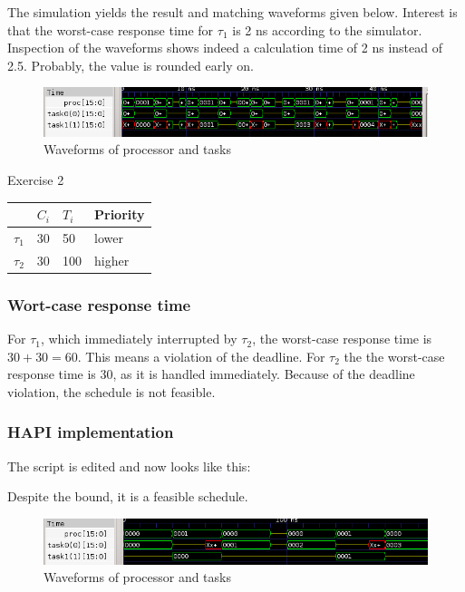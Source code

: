 \begin{homeworkProblem}
The simulation yields the result and matching waveforms given below. Interest is that the worst-case response time for $\tau_1$ is 2 ns according to the simulator. 
Inspection of the waveforms shows indeed a calculation time of 2 ns instead of 2.5. Probably, the value is rounded early on.


\begin{figure}[h]
	\label{fig:hapi_wave_1}
	\includegraphics[width=480px]{figures/hapi_wave_1.png}
	\caption{Waveforms of processor and tasks}
\end{figure}

\newpage

\begin{homeworkSection}{Exercise 2}
\begin{tabular}{l|l|l|l}
	& $C_i$ & $T_i$ & Priority \\
	\hline
	$\tau_1$ & 30 & 50 & lower \\
	\hline
	$\tau_2$ & 30 & 100 & higher \\
\end{tabular}

\subsubsection{Wort-case response time}

For $\tau_1$, which immediately interrupted by $\tau_2$, the worst-case response time is $30+30=60$. This means a violation of the deadline. 
For $\tau_2$ the the worst-case response time is 30, as it is handled immediately.
Because of the deadline violation, the schedule is not feasible.

\subsubsection{HAPI implementation}

The script is edited and now looks like this:


Despite the bound, it is a feasible schedule.

\begin{figure}[h]
	\label{fig:hapi_wave_2}
	\includegraphics[width=480px]{figures/hapi_wave_2.png}
	\caption{Waveforms of processor and tasks}
\end{figure}


\end{homeworkSection}
\end{homeworkProblem}
